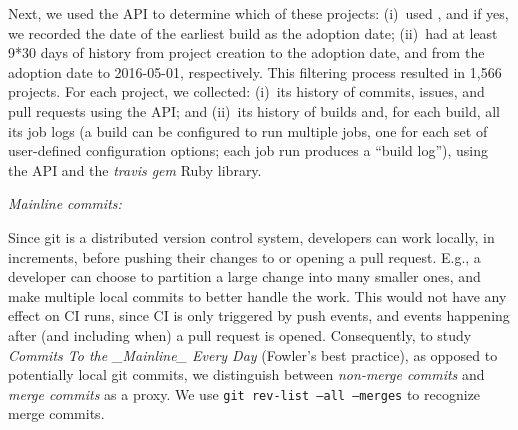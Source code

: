
Next, we used the \Tvis API to determine which of these projects:
(i)~used \Tvis, and if yes, we recorded the date of the earliest build as the 
adoption date; (ii)~had at least 9*30 days of history from project creation to 
the adoption date, and from the adoption date to 2016-05-01, respectively. 
This filtering process resulted in 1,566 projects.
For each project, we collected: (i)~its history of commits, issues, and pull 
requests using the \GH API; and (ii)~its history of \Tvis builds and, for each
build, all its job logs (a \Tvis build can be configured to run multiple jobs,
one for each set of user-defined configuration options; each job run produces 
a ``build log''), using the \Tvis API and the \textit{travis gem} Ruby library.  

\smallskip\noindent\emph{Mainline commits:}

Since git is a distributed version control system, developers can work locally,
in increments, before pushing their changes to \GH or opening a pull request.
E.g., a developer can choose to partition a large change into many smaller 
ones, and make multiple local commits to better handle the work.
This would not have any effect on CI runs, since CI is only triggered by \GH 
push events, and events happening after (and including when) a pull request 
is opened.
Consequently, to study \emph{Commits To the \_Mainline\_ Every Day}
(Fowler's best practice), as opposed to potentially local git commits, we
distinguish between \emph{non-merge commits} and \emph{merge commits}
as a proxy.
We use  \texttt{\small git rev-list --all --merges} to recognize merge commits.

